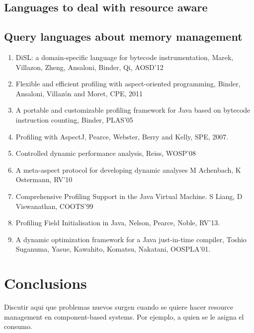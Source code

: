 \subsection{Languages to deal with resource aware}

\subsection{Query languages about memory management}

\begin{enumerate}
\item DiSL: a domain-specific language for bytecode instrumentation, Marek, Villazon, Zheng, Ansaloni, Binder, Qi, AOSD'12

\item Flexible and efficient profiling with aspect-oriented programming, Binder, Ansaloni, Villazón and Moret, CPE, 2011

\item A portable and customizable profiling framework for Java based on bytecode instruction counting, Binder, PLAS'05

\item Profiling with AspectJ, Pearce, Webster, Berry and Kelly, SPE, 2007.

\item Controlled dynamic performance analysis, Reiss, WOSP'08

\item A meta-aspect protocol for developing dynamic analyses M Achenbach, K Ostermann, RV'10

\item Comprehensive Profiling Support in the Java Virtual Machine. S Liang, D Viswanathan, COOTS'99

\item Profiling Field Initialisation in Java, Nelson, Pearce, Noble, RV'13.

\item A dynamic optimization framework for a Java just-in-time compiler, Toshio Suganuma, Yasue, Kawahito, Komatsu, Nakatani, OOSPLA'01.
\end{enumerate}



\section{Conclusions}

Discutir aqui que problemas nuevos surgen cuando se quiere hacer resource management en component-based systems. Por ejemplo, a quien se le asigna el consumo.

